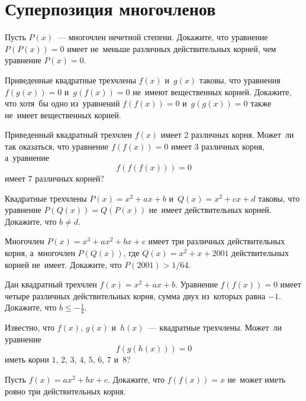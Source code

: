 
\section*{Суперпозиция многочленов}


\begin{problems}

\item
Пусть $P(x)$~--- многочлен нечетной степени.
Докажите, что уравнение $P(P(x)) = 0$ имеет не~меньше различных действительных
корней, чем уравнение $P(x) = 0$.

\item
Приведенные квадратные трехчлены $f(x)$ и~$g(x)$ таковы, что уравнения
$f(g(x)) = 0$ и~$g(f(x)) = 0$ не~имеют вещественных корней.
Докажите, что хотя~бы одно из~уравнений $f(f(x)) = 0$ и~$g(g(x)) = 0$ также
не~имеет вещественных корней.

\item
Приведенный квадратный трехчлен $f(x)$ имеет 2 различных корня.
Может~ли так оказаться, что уравнение $f(f(x)) = 0$ имеет 3 различных корня,
а~уравнение
\[
    f(f(f(x))) = 0
\]
имеет 7 различных корней?

\item
Квадратные трехчлены $P(x) = x^2 + a x + b$ и~$Q(x) = x^2 + c x + d$ таковы,
что уравнение $P(Q(x)) = Q(P(x))$ не~имеет действительных корней.
Докажите, что $b \neq d$.

\item
Многочлен $P(x) = x^3 + a x^2 + b x + c$ имеет три различных действительных
корня, а~многочлен $P(Q(x))$, где $Q(x) = x^2 + x + 2001$ действительных корней
не~имеет.
Докажите, что $P(2001) > 1 / 64$.

\item
Дан квадратный трехчлен $f(x) = x^2 + a x + b$.
Уравнение $f(f(x)) = 0$ имеет четыре различных действительных корня, сумма двух
из~которых равна $-1$.
Докажите, что $b \leq -\frac{1}{4}$.

\item
Известно, что $f(x)$, $g(x)$ и~$h(x)$~--- квадратные трехчлены.
Может~ли уравнение
\[
    f(g(h(x))) = 0
\]
иметь корни $1$, $2$, $3$, $4$, $5$, $6$, $7$ и~$8$?

\item
Пусть $f(x) = a x^2 + b x + c$.
Докажите, что $f(f(x)) = x$ не~может иметь ровно три действительных корня.

\end{problems}

